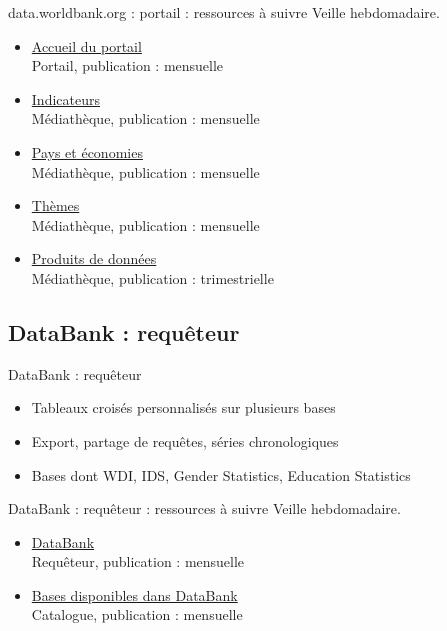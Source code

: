 \documentclass[aspectratio=169,11pt]{beamer}
\begin{document}
\begin{frame}{data.worldbank.org : portail : ressources à suivre}
\small
Veille hebdomadaire.
\begin{itemize}
\item \href{https://data.worldbank.org}{Accueil du portail}\\{\footnotesize Portail, publication : mensuelle}
\item \href{https://data.worldbank.org/indicator}{Indicateurs}\\{\footnotesize Médiathèque, publication : mensuelle}
\item \href{https://data.worldbank.org/country}{Pays et économies}\\{\footnotesize Médiathèque, publication : mensuelle}
\item \href{https://data.worldbank.org/topic}{Thèmes}\\{\footnotesize Médiathèque, publication : mensuelle}
\item \href{https://data.worldbank.org/products}{Produits de données}\\{\footnotesize Médiathèque, publication : trimestrielle}
\end{itemize}
\end{frame}

\subsection{DataBank : requêteur}
\begin{frame}{DataBank : requêteur}
\begin{itemize}
\item Tableaux croisés personnalisés sur plusieurs bases
\item Export, partage de requêtes, séries chronologiques
\item Bases dont WDI, IDS, Gender Statistics, Education Statistics
\end{itemize}
\end{frame}

\begin{frame}{DataBank : requêteur : ressources à suivre}
\small
Veille hebdomadaire.
\begin{itemize}
\item \href{https://databank.worldbank.org}{DataBank}\\{\footnotesize Requêteur, publication : mensuelle}
\item \href{https://databank.worldbank.org/databases}{Bases disponibles dans DataBank}\\{\footnotesize Catalogue, publication : mensuelle}
\end{itemize}
\end{frame}
\end{document}
